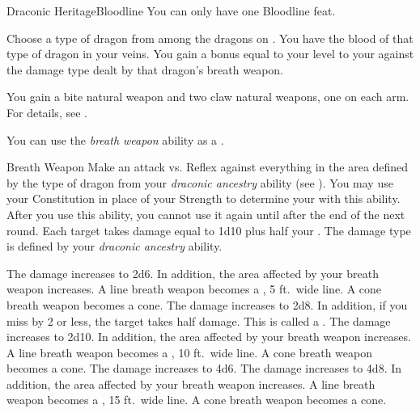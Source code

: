     \begin{feat}{Draconic Heritage}{Bloodline}
         You can only have one Bloodline feat.

         Choose a type of dragon from among the dragons on .
        You have the blood of that type of dragon in your veins.
        You gain a bonus equal to your level to your  against the damage type dealt by that dragon's breath weapon.

         You gain a bite natural weapon and two claw natural weapons, one on each arm.
        For details, see .

         You can use the \textit{breath weapon} ability as a .
        \begin{freeability}{Breath Weapon}
            Make an attack vs. Reflex against everything in the area defined by the type of dragon from your \textit{draconic ancestry} ability (see ).
            You may use your Constitution in place of your Strength to determine your  with this ability.
            After you use this ability, you cannot use it again until after the end of the next round.
            \hit Each target takes damage equal to 1d10 plus half your .
            The damage type is defined by your \textit{draconic ancestry} ability.

            \rankline
             The damage increases to 2d6.
                In addition, the area affected by your breath weapon increases.
                A line breath weapon becomes a \arealarge, 5 ft.\ wide line.
                A cone breath weapon becomes a \areamed cone.
             The damage increases to 2d8.
                In addition, if you miss by 2 or less, the target takes half damage.
                This is called a .
             The damage increases to 2d10.
                In addition, the area affected by your breath weapon increases.
                A line breath weapon becomes a \areahuge, 10 ft.\ wide line.
                A cone breath weapon becomes a \arealarge cone.
             The damage increases to 4d6.
             The damage increases to 4d8.
                In addition, the area affected by your breath weapon increases.
                A line breath weapon becomes a \areagarg, 15 ft.\ wide line.
                A cone breath weapon becomes a \areahuge cone.
        \end{freeability}


\end{feat}
